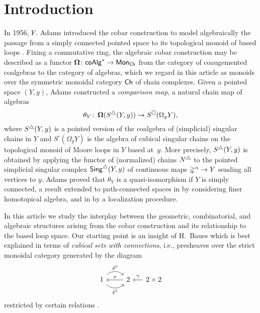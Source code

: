 
\section{Introduction}

In 1956, F. Adams introduced the cobar construction to model algebraically the passage from a simply connected pointed space to its topological monoid of based loops \cite{adams1956cobar}.
Fixing a commutative ring, the algebraic cobar construction may be described as a functor $\operatorname{\mathbf{\Omega}} \colon \mathsf{coAlg}^* \to \mathsf{Mon}_{\mathsf{Ch}}$ from the category of coaugemented coalgebras to the category of algebras, which we regard in this article as monoids over the symmetric monoidal category $\mathsf{Ch}$ of chain complexes.
Given a pointed space $(Y, y)$, Adams constructed a \textit{comparison map}, a natural chain map of algebras
\begin{equation} \label{e:adams map}
\theta_Y \colon \operatorname{\mathbf{\Omega}}(S^{\triangle}(Y, y)) \to S^{\square}(\Omega_y Y),
\end{equation}
where $S^{\triangle}(Y,y)$ is a pointed version of the coalgebra of (simplicial) singular chains in $Y$ and $S^{\square}(\Omega_yY)$ is the algebra of cubical singular chains on the topological monoid of Moore loops in $Y$ based at~$y$.
More precisely, $S^{\triangle}(Y,y)$ is obtained by applying the functor of (normalized) chains $N^{\triangle}$ to the pointed simplicial singular complex $\mathsf{Sing}^{\triangle}(Y, y)$ of continuous maps $\mathbb{\Delta}^n \to Y$ sending all vertices to $y$.
Adams proved that $\theta_Y$ is a quasi-isomorphism if $Y$ is simply connected, a result extended to path-connected spaces in \cite{rivera2018cubical} by considering finer homotopical algebra, and in \cite{hess2010cobar} by a localization procedure.

In this article we study the interplay between the geometric, combinatorial, and algebraic structures arising from the cobar construction and its relationship to the based loop space.
Our starting point is an insight of H.~Baues which is best explained in terms of \textit{cubical sets with connections}, i.e., presheaves over the 
strict monoidal category generated by the diagram
\begin{equation*}
\begin{tikzcd}
1 \arrow[r, out=45, in=135, "\delta^0"] \arrow[r, out=-45, in=-135, "\delta^1"'] & 2 \arrow[l, "\sigma"'] &[-10pt] \arrow[l, "\gamma"'] 2 \times 2
\end{tikzcd}
\end{equation*}
restricted by certain relations \cite{brown1981cubes, grandis2003cubical}.

